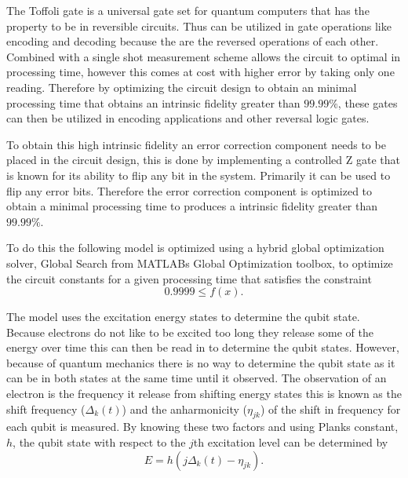 


The Toffoli gate is a universal gate set\cite{Zahedinejad2015} for quantum computers that has the property to be in reversible circuits.   Thus can be utilized in gate operations like encoding and decoding because the are the reversed operations of each other. Combined with a single shot measurement scheme allows the circuit to optimal in processing time, however this comes at cost with higher error by taking only one reading. Therefore by optimizing the circuit design to obtain an minimal
processing time that obtains an intrinsic fidelity greater than $99.99\%$, these gates can then be utilized in encoding applications and other reversal logic gates. 

To obtain this high intrinsic fidelity an error correction component needs to be placed in the circuit design, this is done by implementing a controlled Z gate that is known for its ability to flip any bit in the system. Primarily it can be used to flip any error bits. Therefore the error correction component is optimized to obtain a minimal processing time to produces a intrinsic fidelity greater than $99.99\%$\cite{Barends2014}.

To do this the following model is optimized using a hybrid global optimization solver, Global Search from MATLABs Global Optimization toolbox, to optimize the circuit constants for a given processing time that satisfies the constraint
\begin{equation}
    \label{eq:feasibility}
    0.9999 \leq f(x).
\end{equation}

The model uses the excitation energy states to determine the qubit state. Because electrons do not like to be excited too long they release some of the energy over time this can then be read in to determine the qubit states. However, because of quantum mechanics there is no way to determine the qubit state as it can be in both states at the same time until it observed. The observation of an electron is the frequency it release from shifting energy states this is known as the shift frequency
($\Delta_k(t)$) and the anharmonicity  ($\eta_{jk}$) of the shift in frequency for each qubit is measured. By knowing these two factors and using Planks constant, $h$, the qubit state with respect to the $j$th excitation level can be determined by
\begin{equation}
  \label{eq:qubit energy}
  E = h(j\Delta_k(t)-\eta_{jk}).
\end{equation}

